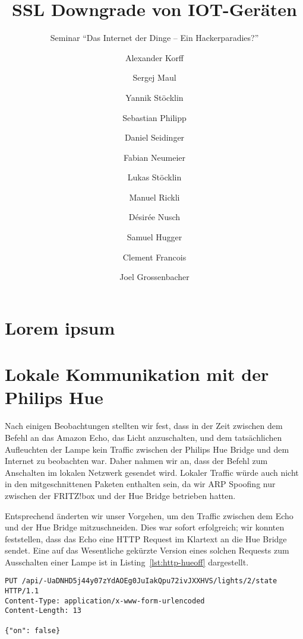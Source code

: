 \documentclass[11pt,a4paper]{scrartcl}
\title{SSL Downgrade von IOT-Geräten}
\subtitle{Seminar ``Das Internet der Dinge -- Ein Hackerparadies?''}
\author{Alexander Korff\and
Sergej Maul\and
Yannik Stöcklin\and
Sebastian Philipp\and
Daniel Seidinger\and
Fabian Neumeier\and
Lukas Stöcklin\and
Manuel Rickli\and
Désirée Nusch\and
Samuel Hugger\and
Clement Francois\and
Joel Grossenbacher}
\begin{document}
\maketitle
\section{Lorem ipsum}
\lipsum
\section{Lokale Kommunikation mit der Philips Hue}
Nach einigen Beobachtungen stellten wir fest, dass in der Zeit zwischen dem Befehl an das
Amazon Echo, das Licht anzuschalten, und dem tatsächlichen Aufleuchten der Lampe kein
Traffic zwischen der Philips Hue Bridge und dem Internet zu beobachten war. Daher nahmen wir
an, dass der Befehl zum Anschalten im lokalen Netzwerk gesendet wird. Lokaler Traffic würde
auch nicht in den mitgeschnittenen Paketen enthalten sein, da wir ARP Spoofing nur zwischen
der FRITZ!box und der Hue Bridge betrieben hatten.

Entsprechend änderten wir unser Vorgehen,
um den Traffic zwischen dem Echo und der Hue Bridge mitzuschneiden. Dies war sofort
erfolgreich; wir konnten feststellen, dass das Echo eine HTTP Request im Klartext an die Hue
Bridge sendet. Eine auf das Wesentliche gekürzte Version eines solchen Requests zum
Ausschalten einer Lampe ist in Listing~\ref{lst:http-hueoff} dargestellt.
\begin{lstlisting}[label={lst:http-hueoff},caption={Ein HTTP Request zum Ausschalten von Lampe Nr. 2.},float,floatplacement=H]
PUT /api/-UaDNHD5j44y07zYdAOEg0JuIakQpu72ivJXXHVS/lights/2/state HTTP/1.1
Content-Type: application/x-www-form-urlencoded
Content-Length: 13

{"on": false}
\end{lstlisting}
\end{document}
